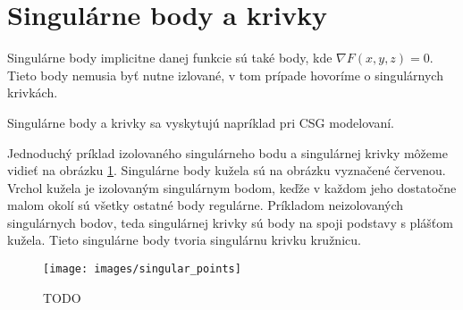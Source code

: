 \section{Singulárne body a krivky}

Singulárne body implicitne danej funkcie sú také body, kde $\nabla F(x, y, z) = 0$. Tieto body nemusia byť nutne izlované, 
v tom prípade hovoríme o singulárnych krivkách. 

Singulárne body a krivky sa vyskytujú napríklad pri CSG modelovaní. 

Jednoduchý príklad izolovaného singulárneho bodu a 
singulárnej krivky môžeme vidieť na obrázku \ref{obr:singular_points}. Singulárne
body kužela sú na obrázku vyznačené červenou. Vrchol kužela je izolovaným singulárnym bodom, keďže v 
každom jeho dostatočne malom okolí sú všetky ostatné body regulárne. Príkladom neizolovaných singulárnych
bodov, teda singulárnej krivky sú body na spoji podstavy s plášťom kužela. Tieto singulárne body tvoria 
singulárnu krivku kružnicu.

\begin{figure}
    \centerline{\texttt{[image: images/singular\_points]}}
    \caption[TODO]{TODO}
    \label{obr:singular_points}
\end{figure}

    
